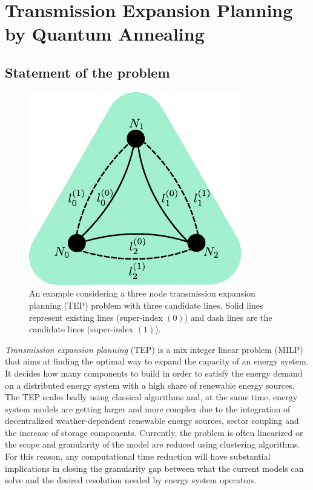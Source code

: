 \chapter{Transmission Expansion Planning by Quantum Annealing} %
\label{Chapter4} %
\section{Statement of the problem}
\begin{figure}
\includegraphics[scale=0.9]{Figures/3Node_Layer 1.pdf} 
\caption{An example considering a three node transmission expansion planning (TEP) problem with three candidate lines. Solid lines represent existing lines (super-index $(0)$) and dash lines are the candidate lines (super-index $(1)$).}
\label{fig:3node}
\end{figure}
\textit{Transmission expansion planning} (TEP)\cite{Neumann2020TransmissionFlows} is a mix integer linear problem (MILP) that aims at finding the optimal way to expand the capacity of an energy system. It decides how many components to build in order to satisfy the energy demand on a distributed energy system with a high share of renewable energy sources. The TEP scales badly using classical algorithms and, at the same time, energy system models are getting larger and more complex due to the integration of decentralized weather-dependent renewable energy sources, sector coupling and the increase of storage components. Currently, the problem is often linearized or the scope and granularity of the model are reduced using clustering algorithms. For this reason, any computational time reduction will have substantial implications in closing the granularity gap between what the current models can solve and the desired resolution needed by energy system operators.
